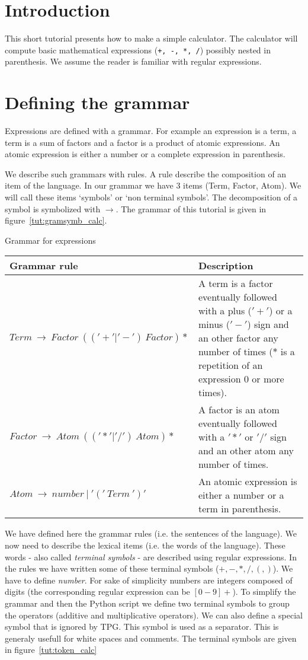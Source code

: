 \section{Introduction}

This short tutorial presents how to make a simple calculator.
The calculator will compute basic mathematical expressions (\verb|+, -, *, /|) possibly nested in parenthesis.
We assume the reader is familiar with regular expressions.

\section{Defining the grammar}

Expressions are defined with a grammar.
For example an expression is a term, a term is a sum of factors and a factor is a product of atomic expressions. An atomic expression is either a number or a complete expression in parenthesis.

We describe such grammars with rules. A rule describe the composition of an item of the language. In our grammar we have 3 items (Term, Factor, Atom). We will call these items `symbols' or `non terminal symbols'. The decomposition of a symbol is symbolized with $\to$.
The grammar of this tutorial is given in figure~\ref{tut:gramsymb_calc}.

\begin{tableau}
\caption{Grammar for expressions}							\label{tut:gramsymb_calc}
\begin{tabular}{| l | p{7cm} |}
\hline
	Grammar rule & Description \\
\hline
\hline
	$Term~\to~Factor~(('+'|'-')~Factor)*$
		& A term is a factor eventually followed with a plus ($'+'$) or a minus ($'-'$) sign and an other factor any number of times ($*$ is a repetition of an expression 0 or more times). \\
\hline
	$Factor~\to~Atom~(('*'|'/')~Atom)*$
		& A factor is an atom eventually followed with a $'*'$ or $'/'$ sign and an other atom any number of times. \\
\hline
	$Atom~\to~number~|~'('~Term~')'$
		& An atomic expression is either a number or a term in parenthesis. \\
\hline
\end{tabular}
\end{tableau}

We have defined here the grammar rules (i.e. the sentences of the language). We now need to describe the lexical items (i.e. the words of the language). These words - also called \emph{terminal symbols} - are described using regular expressions. In the rules we have written some of these terminal symbols ($+, -, *, /, (, )$). We have to define \emph{number}. For sake of simplicity numbers are integers composed of digits (the corresponding regular expression can be $[0-9]+$).
To simplify the grammar and then the Python script we define two terminal symbols to group the operators (additive and multiplicative operators). We can also define a special symbol that is ignored by TPG. This symbol is used as a separator. This is generaly usefull for white spaces and comments. The terminal symbols are given in figure~\ref{tut:token_calc}


